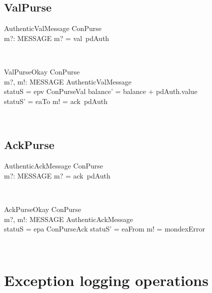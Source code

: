 \subsection{ValPurse}

\begin{LSDef}
\begin{schema}{AuthenticValMessage}
   ConPurse \\
   m?: MESSAGE
\where
   m? = val~pdAuth
\end{schema}~\end{LSDef}

\begin{LSDef}
\begin{schema}{ValPurseOkay}
   \Delta ConPurse \\
   m?, m!: MESSAGE
\where
   AuthenticValMessage \\
   statuS = epv
   \also
   \Xi ConPurseVal
   \also
   balance' = balance + pdAuth.value \\
   statuS' = eaTo
   \also
   m! = ack~pdAuth
\end{schema}~\end{LSDef}

\subsection{AckPurse}

\begin{LSDef}
\begin{schema}{AuthenticAckMessage}
   ConPurse \\
   m?: MESSAGE
\where
   m? = ack~pdAuth
\end{schema}~\end{LSDef}

\begin{LSDef}
\begin{schema}{AckPurseOkay}
   \Delta ConPurse \\
   m?, m!: MESSAGE
\where
   AuthenticAckMessage \\
   statuS = epa
   \also
   \Xi ConPurseAck
   \also
   statuS' = eaFrom
   \also
   m! = mondexError
\end{schema}~\end{LSDef}

\section{Exception logging operations}\label{ch4.exlog}

